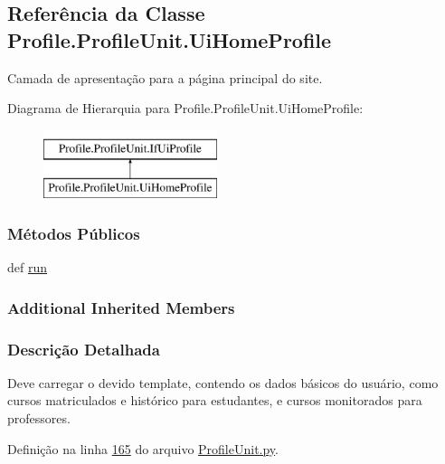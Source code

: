 \hypertarget{classProfile_1_1ProfileUnit_1_1UiHomeProfile}{\subsection{Referência da Classe Profile.\-Profile\-Unit.\-Ui\-Home\-Profile}
\label{classProfile_1_1ProfileUnit_1_1UiHomeProfile}
}


Camada de apresentação para a página principal do site.  


Diagrama de Hierarquia para Profile.\-Profile\-Unit.\-Ui\-Home\-Profile\-:\begin{figure}[H]
\begin{center}
\leavevmode
\includegraphics[height=2.000000cm]{db/dcf/classProfile_1_1ProfileUnit_1_1UiHomeProfile}
\end{center}
\end{figure}
\subsubsection*{Métodos Públicos}
\begin{DoxyCompactItemize}
\item 
def \hyperlink{classProfile_1_1ProfileUnit_1_1UiHomeProfile_a5abc7f7c1ca1cb3e070c36a869263e6d}{run}
\end{DoxyCompactItemize}
\subsubsection*{Additional Inherited Members}


\subsubsection{Descrição Detalhada}
Deve carregar o devido template, contendo os dados básicos do usuário, como cursos matriculados e histórico para estudantes, e cursos monitorados para professores. 

Definição na linha \hyperlink{ProfileUnit_8py_source_l00165}{165} do arquivo \hyperlink{ProfileUnit_8py_source}{Profile\-Unit.\-py}.




